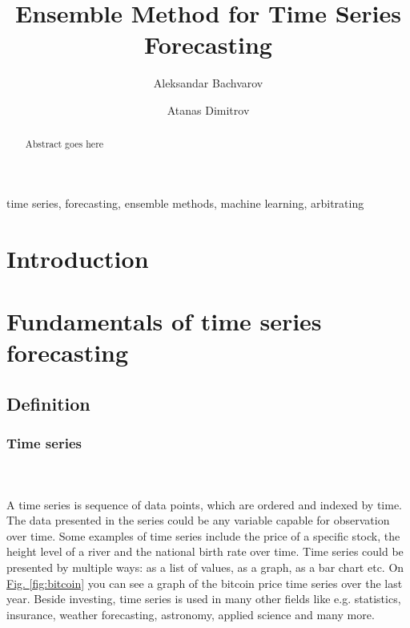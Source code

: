 \documentclass[runningheads,a4paper]{llncs}[2015/06/24]
\begin{document}
\title{Ensemble Method for Time Series Forecasting}

\author{Aleksandar Bachvarov \and Atanas Dimitrov}

%

			
\maketitle

\begin{abstract}
Abstract goes here
\end{abstract}

\begin{keywords}
time series, forecasting, ensemble methods, machine learning, arbitrating  
\end{keywords}


\section{Introduction}\label{sec:intro}

\section{Fundamentals of time series forecasting}

	\subsection{Definition}
		\subsubsection{Time series}
		 \hspace{1cm}\\\\A time series is sequence of data points, which are ordered and indexed by time. The data presented in the series could be any variable capable for observation over time. Some examples of time series include the price of a specific stock, the height level of a river and the national birth rate over time. Time series could be presented by multiple ways: as a list of values, as a graph, as a bar chart etc. On  \hyperref[fig:bitcoin]{Fig. \ref{fig:bitcoin}} you can see a graph of the bitcoin price time series over the last year. Beside investing, time series is used in many other fields like e.g. statistics, insurance, weather forecasting, astronomy, applied  science and many more.
		
\end{document}
